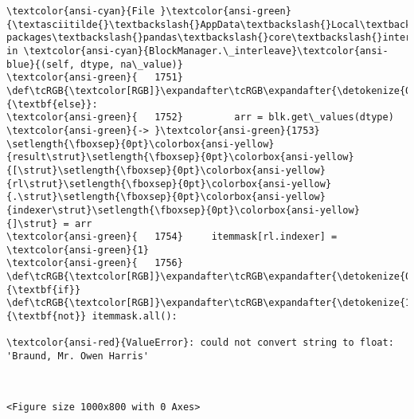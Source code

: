 \documentclass[11pt]{article}
\begin{document}
\begin{Verbatim}[commandchars=\\\{\}, frame=single, framerule=2mm, rulecolor=\color{outerrorbackground}]
\textcolor{ansi-cyan}{File }\textcolor{ansi-green}{\textasciitilde{}\textbackslash{}AppData\textbackslash{}Local\textbackslash{}Programs\textbackslash{}Python\textbackslash{}Python313\textbackslash{}Lib\textbackslash{}site-packages\textbackslash{}pandas\textbackslash{}core\textbackslash{}internals\textbackslash{}managers.py:1753}, in \textcolor{ansi-cyan}{BlockManager.\_interleave}\textcolor{ansi-blue}{(self, dtype, na\_value)}
\textcolor{ansi-green}{   1751}     \def\tcRGB{\textcolor[RGB]}\expandafter\tcRGB\expandafter{\detokenize{0,135,0}}{\textbf{else}}:
\textcolor{ansi-green}{   1752}         arr = blk.get\_values(dtype)
\textcolor{ansi-green}{-> }\textcolor{ansi-green}{1753}     \setlength{\fboxsep}{0pt}\colorbox{ansi-yellow}{result\strut}\setlength{\fboxsep}{0pt}\colorbox{ansi-yellow}{[\strut}\setlength{\fboxsep}{0pt}\colorbox{ansi-yellow}{rl\strut}\setlength{\fboxsep}{0pt}\colorbox{ansi-yellow}{.\strut}\setlength{\fboxsep}{0pt}\colorbox{ansi-yellow}{indexer\strut}\setlength{\fboxsep}{0pt}\colorbox{ansi-yellow}{]\strut} = arr
\textcolor{ansi-green}{   1754}     itemmask[rl.indexer] = \textcolor{ansi-green}{1}
\textcolor{ansi-green}{   1756} \def\tcRGB{\textcolor[RGB]}\expandafter\tcRGB\expandafter{\detokenize{0,135,0}}{\textbf{if}} \def\tcRGB{\textcolor[RGB]}\expandafter\tcRGB\expandafter{\detokenize{175,0,255}}{\textbf{not}} itemmask.all():

\textcolor{ansi-red}{ValueError}: could not convert string to float: 'Braund, Mr. Owen Harris'
    \end{Verbatim}

    \begin{center}
    \end{center}
    { \hspace*{\fill} \\}
    
    
    \begin{Verbatim}[commandchars=\\\{\}]
<Figure size 1000x800 with 0 Axes>
    \end{Verbatim}
\end{document}
